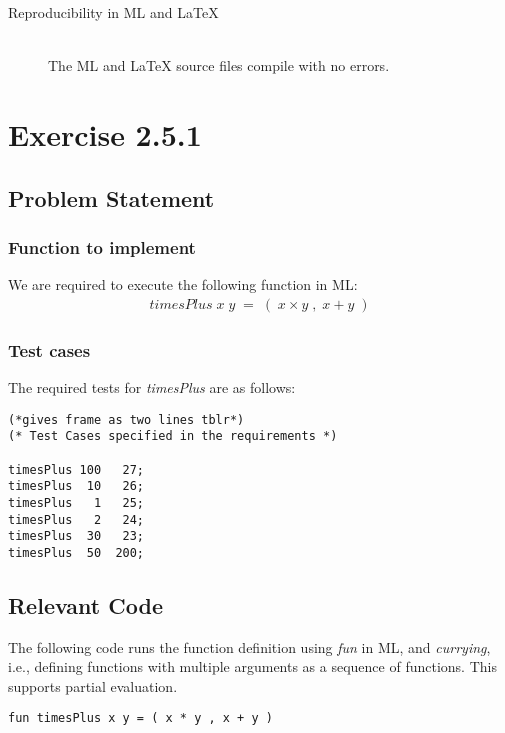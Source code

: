 \documentclass{report}
\begin{document}
\begin{description}
\item[Reproducibility in ML and \LaTeX{}] \ \\
  The ML and \LaTeX{} source files compile with no errors.
\end{description}

\chapter{Exercise 2.5.1}
\label{cha:exercise-2.5.1}

\section{Problem Statement}
\label{sec:problem-statement}

\subsection{Function to implement}
\label{sec:function-implement}

We are required to execute the following function in ML:\\
\begin{align*}
  timesPlus \;x\;y \;=\; ( \;x\times y\;,\;x+y\;)
\end{align*}

\subsection{Test cases}
\label{sec:test-cases}
The required tests for \emph{timesPlus} are as follows:
\begin{lstlisting}[frame=TBLR](*gives frame as two lines tblr*)
(* Test Cases specified in the requirements *)

timesPlus 100   27; 
timesPlus  10   26; 
timesPlus   1   25; 
timesPlus   2   24;
timesPlus  30   23; 
timesPlus  50  200;
\end{lstlisting}

\section{Relevant Code}
\label{sec:relevant-code}

The following code runs the function definition using
\textit{fun} in ML, and \textit{currying}, i.e., defining functions
with multiple arguments as a sequence of functions. This supports
partial evaluation.

\lstset{frameround=tftf}%
\begin{lstlisting}[frame=trbl]
  fun timesPlus x y = ( x * y , x + y )
\end{lstlisting}
\end{document}

